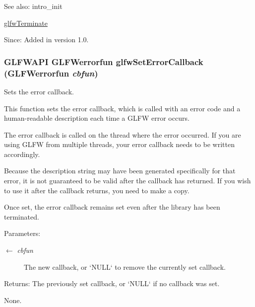 \begin{Desc}
\item[See also:]intro\_\-init 

\hyperlink{group__init_gfd90e6fd4819ea9e22e5e739519a6504}{glfwTerminate}\end{Desc}
\begin{Desc}
\item[Since:]Added in version 1.0. \end{Desc}
\hypertarget{group__init_g5919096b958c47102126061fb5a6f9c3}{
\subsubsection[glfwSetErrorCallback]{\setlength{\rightskip}{0pt plus 5cm}GLFWAPI {\bf GLFWerrorfun} glfwSetErrorCallback ({\bf GLFWerrorfun} {\em cbfun})}}
\label{group__init_g5919096b958c47102126061fb5a6f9c3}


Sets the error callback. 

This function sets the error callback, which is called with an error code and a human-readable description each time a GLFW error occurs.

The error callback is called on the thread where the error occurred. If you are using GLFW from multiple threads, your error callback needs to be written accordingly.

Because the description string may have been generated specifically for that error, it is not guaranteed to be valid after the callback has returned. If you wish to use it after the callback returns, you need to make a copy.

Once set, the error callback remains set even after the library has been terminated.

\begin{Desc}
\item[Parameters:]
\begin{description}
\item[\mbox{$\leftarrow$} {\em cbfun}]The new callback, or `NULL` to remove the currently set callback. \end{description}
\end{Desc}
\begin{Desc}
\item[Returns:]The previously set callback, or `NULL` if no callback was set.\end{Desc}
None.

